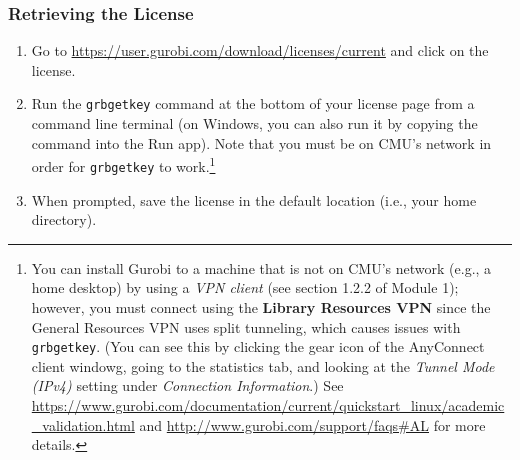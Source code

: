 \documentclass[12pt]{article}
\begin{document}
\subsubsection{Retrieving the License}
\begin{enumerate}
    \item Go to \url{ https://user.gurobi.com/download/licenses/current} and click on the license.
    \item Run the \texttt{grbgetkey} command at the bottom of your license page from a command line terminal (on Windows, you can also run it by copying the command into the Run app).
        Note that you must be on CMU's network in order for \texttt{grbgetkey} to work.\footnote{
            You can install Gurobi to a machine that is not on CMU's network (e.g., a home desktop) by using a \emph{VPN client} (see section 1.2.2 of Module 1); however, you must connect using the \textbf{Library Resources VPN} since the General Resources VPN uses split tunneling, which causes issues with \texttt{grbgetkey}.
            (You can see this by clicking the gear icon of the AnyConnect client windowg, going to the statistics tab, and looking at the \emph{Tunnel Mode (IPv4)} setting under \emph{Connection Information}.)
            See \url{https://www.gurobi.com/documentation/current/quickstart_linux/academic_validation.html} and \url{http://www.gurobi.com/support/faqs\#AL} for more details.
        }
    \item When prompted, save the license in the default location (i.e., your home directory).
\end{enumerate}
\end{document}
